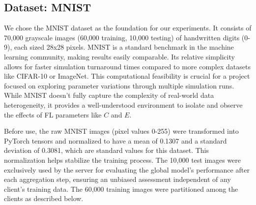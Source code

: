 \documentclass[conference]{IEEEtran}
\begin{document}
\subsection{Dataset: MNIST}
We chose the MNIST dataset \cite{b4} as the foundation for our experiments. It consists of 70,000 grayscale images (60,000 training, 10,000 testing) of handwritten digits (0-9), each sized 28x28 pixels. MNIST is a standard benchmark in the machine learning community, making results easily comparable. Its relative simplicity allows for faster simulation turnaround times compared to more complex datasets like CIFAR-10 or ImageNet. This computational feasibility is crucial for a project focused on exploring parameter variations through multiple simulation runs. While MNIST doesn't fully capture the complexity of real-world data heterogeneity, it provides a well-understood environment to isolate and observe the effects of FL parameters like $C$ and $E$.

Before use, the raw MNIST images (pixel values 0-255) were transformed into PyTorch tensors and normalized to have a mean of 0.1307 and a standard deviation of 0.3081, which are standard values for this dataset. This normalization helps stabilize the training process. The 10,000 test images were exclusively used by the server for evaluating the global model's performance after each aggregation step, ensuring an unbiased assessment independent of any client's training data. The 60,000 training images were partitioned among the clients as described below.
\end{document}
